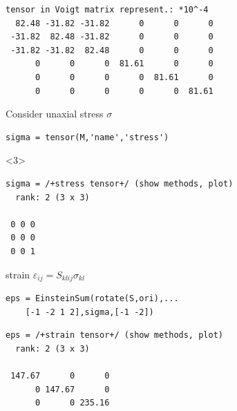 \documentclass[compress]{beamer}
\begin{document}
\begin{frame}[fragile]
\begin{columns}
\begin{column}{0.65\textwidth}
\begin{overlayarea}{\textwidth}{\textheight}
\begin{onlyenv}
\begin{lstlisting}[style=output]
  tensor in Voigt matrix represent.: *10^-4
  82.48 -31.82 -31.82      0      0      0
 -31.82  82.48 -31.82      0      0      0
 -31.82 -31.82  82.48      0      0      0
      0      0      0  81.61      0      0
      0      0      0      0  81.61      0
      0      0      0      0      0  81.61
  \end{lstlisting}
  \end{onlyenv}

  \pause

  Consider unaxial stress $\sigma$
  \vspace{-0.2cm}
  \begin{lstlisting}[style=input]
sigma = tensor(M,'name','stress')
\end{lstlisting}
\begin{onlyenv}<3>
    \vspace{-0.4cm}
  \begin{lstlisting}[style=output]
sigma = /+stress tensor+/ (show methods, plot)
  rank: 2 (3 x 3)

 0 0 0
 0 0 0
 0 0 1
  \end{lstlisting}
  \end{onlyenv}

  \pause

  strain $\varepsilon_{ij} = S_{klij} \sigma_{kl}$
  \vspace{-0.2cm}
  \begin{lstlisting}[style=input]
eps = EinsteinSum(rotate(S,ori),...
    [-1 -2 1 2],sigma,[-1 -2])
\end{lstlisting}
  \vspace{-0.4cm}
  \begin{lstlisting}[style=output]
eps = /+strain tensor+/ (show methods, plot)
  rank: 2 (3 x 3)

 147.67      0      0
      0 147.67      0
      0      0 235.16
  \end{lstlisting}
\end{overlayarea}
\end{column}


\end{columns}
\end{frame}
\end{document}
